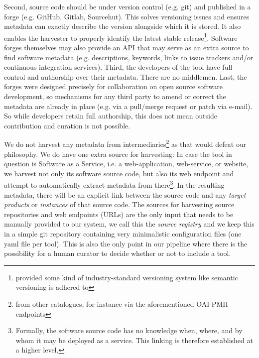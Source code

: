 \documentclass[a4paper,11pt]{article}
\begin{document}
  Second, source code should be under version control (e.g. git) and published in a forge (e.g. GitHub, Gitlab, Sourcehut).
  This solves versioning issues and ensures metadata can exactly describe the version alongside which it is stored. It also enables the 
  harvester to properly identify the latest stable release\footnote{provided some kind of industry-standard versioning system like semantic versioning is adhered to}.
  Software forges themselves may also provide an API that may serve as an extra source to find software metadata (e.g. descriptions, keywords, links to issue trackers and/or continuous integration services).
  Third, the developers of the tool have full control and authorship over their metadata. There are no middlemen.
  Last, the forges were designed precisely for collaboration on open source software development, so mechanisms for any
  third party to amend or correct the metadata are already in place (e.g. via a pull/merge request or patch via e-mail).
  So while developers retain full authorship, this does not mean outside contribution and curation is not possible.

We do not harvest any metadata from intermediaries\footnote{from other catalogues,
for instance via the aforementioned OAI-PMH endpoints} as that would defeat our philosophy. We do
have one extra source for harvesting: In case the tool in question is Software
as a Service, i.e. a web-application, web-service, or website, we harvest not
only its software source code, but also its web endpoint and attempt to
automatically extract metadata from there\footnote{Formally, the software
source code has no knowledge when, where, and by whom it may be deployed as a
service. This linking is therefore established at a higher level.}. In the
resulting metadata, there will be an explicit link between the source code and
any \emph{target products} or \emph{instances} of that source code. The sources
for harvesting source repositories and web endpoints (URLs) are the only input
that needs to be manually provided to our system, we call this the \emph{source
registry} and we keep this in a simple git repository containing very
minimalistic configuration files (one yaml file per tool). This is also the
only point in our pipeline where there is the possibility for a human curator
to decide whether or not to include a tool.
\end{document}
